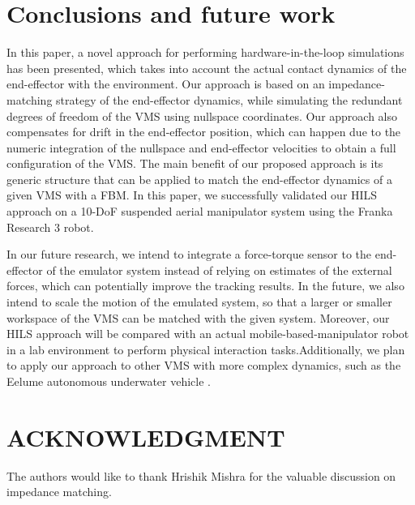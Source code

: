 \documentclass[../main.tex]{subfiles}
\begin{document}
\section{Conclusions and future work}
\label{sec:IROS:conclusions}
In this paper, a novel approach for performing hardware-in-the-loop simulations has been presented, which takes into account the actual contact dynamics of the end-effector with the environment. Our approach is based on an impedance-matching strategy of the end-effector dynamics, while simulating the redundant degrees of freedom of the VMS using nullspace coordinates. Our approach also compensates for drift in the end-effector position, which can happen due to the numeric integration of the nullspace and end-effector velocities to obtain a full configuration of the VMS. The main benefit of our proposed approach is its generic structure that can be applied to match the end-effector dynamics of a given VMS with a FBM. In this paper, we successfully validated our HILS approach on a 10-DoF suspended aerial manipulator system using the Franka Research 3 robot.

In our future research, we intend to integrate a force-torque sensor to the end-effector of the emulator system instead of relying on estimates of the external forces, which can potentially improve the tracking results. In the future, we also intend to scale the motion of the emulated system, so that a larger or smaller workspace of the VMS can be matched with the given system. Moreover, our HILS approach will be compared with an actual  mobile-based-manipulator robot in a lab environment  to perform physical interaction tasks.Additionally, we plan to apply our approach to other VMS with more complex dynamics, such as the Eelume autonomous underwater vehicle \cite{liljeback2017}.








\section*{ACKNOWLEDGMENT}
The authors would like to thank Hrishik Mishra for the valuable discussion on impedance matching.

\ifSubfilesClassLoaded{%
  
  
}{}
\end{document}
